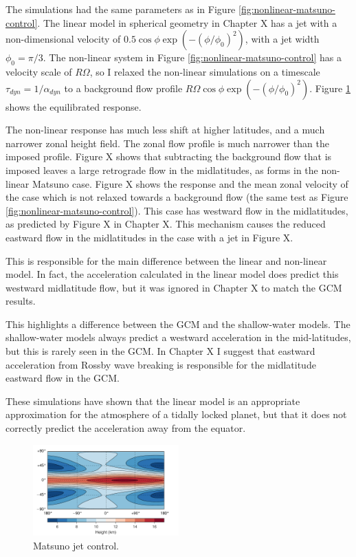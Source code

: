 The simulations had the same parameters as in Figure \ref{fig:nonlinear-matsuno-control}. The linear model in spherical geometry in Chapter X has a jet with a non-dimensional velocity of $0.5 \cos \phi \exp(-(\phi/\phi_{0})^{2})$, with a jet width $\phi_{0} = \pi/3$. The non-linear system in Figure \ref{fig:nonlinear-matsuno-control} has a velocity scale of $R \Omega$, so I relaxed the non-linear simulations on a timescale $\tau_{dyn} = 1 / \alpha_{dyn}$ to a background flow profile $R \Omega \cos \phi \exp(-(\phi/\phi_{0})^{2})$. Figure \ref{fig:matsuno-jet-control} shows the equilibrated response.

The non-linear response has much less shift at higher latitudes, and a much narrower zonal height field. The zonal flow profile is much narrower than the imposed profile. Figure X shows that subtracting the background flow that is imposed leaves a large retrograde flow in the midlatitudes, as forms in the non-linear Matsuno case. Figure X shows the response and the mean zonal velocity of the case which is not relaxed towards a background flow (the same test as Figure \ref{fig:nonlinear-matsuno-control}). This case has westward flow in the midlatitudes, as predicted by Figure X in Chapter X. This mechanism causes the reduced eastward flow in the midlatitudes in the case with a jet in Figure X.


This is responsible for the main difference between the linear and non-linear model. In fact, the acceleration calculated in the linear model does predict this westward midlatitude flow, but it was ignored in Chapter X to match the GCM results.

This highlights a difference between the GCM and the shallow-water models. The shallow-water models always predict a westward acceleration in the mid-latitudes, but this is rarely seen in the GCM. In Chapter X I suggest that eastward acceleration from Rossby wave breaking is responsible for the midlatitude eastward flow in the GCM.

These simulations have shown that the linear model is an appropriate approximation for the atmosphere of a tidally locked planet, but that it does not correctly predict the acceleration away from the equator.

\begin{figure}
  \centering
  \includegraphics[width=0.5\textwidth]{figures/nonlinear-circulation/matsuno-jet-control.pdf}
  \caption{Matsuno jet control.}
  \label{fig:matsuno-jet-control}
\end{figure}

